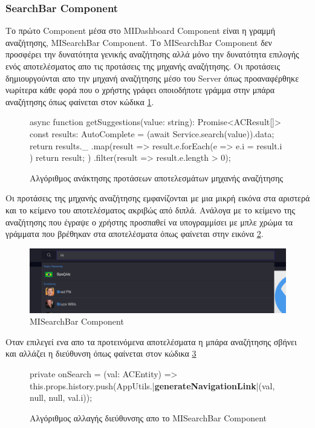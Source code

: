 \subsubsection{SearchBar Component}
Το πρώτο Component μέσα στο MIDashboard Component είναι η γραμμή αναζήτησης, MISearchBar Component. Το MISearchBar Component δεν προσφέρει την δυνατότητα γενικής αναζήτησης αλλά μόνο την δυνατότητα επιλογής ενός αποτελέσματος απο τις προτάσεις της μηχανής αναζήτησης. Οι προτάσεις δημιουργούνται απο την μηχανή αναζήτησης μέσο του Server όπως προαναφέρθηκε νωρίτερα κάθε φορά που ο χρήστης γράφει οποιοδήποτε γράμμα στην μπάρα αναζήτησης όπως φαίνεται στον κώδικα \ref{code:searchbar_suggestion}.

\begin{figure}[H]
    \begin{TypeScriptcode}
async function getSuggestions(value: string): Promise<ACResult[]> {
    const results: AutoComplete = (await Service.search(value)).data;
    return results._
      .map(result => {
        result.e.forEach(e => {
          e.i = result.i
        })
        return result;
      })
      .filter(result => result.e.length > 0);
}
    \end{TypeScriptcode}
    \caption{Αλγόριθμος ανάκτησης προτάσεων αποτελεσμάτων μηχανής αναζήτησης}
   \label{code:searchbar_suggestion}
\end{figure}

Οι προτάσεις της μηχανής αναζήτησης εμφανίζονται με μια μικρή εικόνα στα αριστερά και το κείμενο του αποτελέσματος ακριβώς από διπλά. Ανάλογα με το κείμενο της αναζήτησης που έγραψε ο χρήστης προσπαθεί να υπογραμμίσει με μπλε χρώμα τα γράμματα που βρέθηκαν στα αποτελέσματα όπως φαίνεται στην εικόνα \ref{layout:misearchbar}.
\begin{figure}[H]
  \centering
  \includegraphics[width=145mm]{Chapters/5 - Architecture/Client/Images/misearchbar_results.png}
  \caption{MISearchBar Component}
  \label{layout:misearchbar}
\end{figure}
Οταν επιλεγεί ενα απο τα προτεινόμενα αποτελέσματα η μπάρα αναζήτησης σβήνει και αλλάζει η διεύθυνση όπως φαίνεται στον κώδικα \ref{code:searchbar_urlchange}

\begin{figure}[H]
    \begin{TypeScriptcode}
private onSearch = (val: ACEntity) => {
  this.props.history.push(AppUtils.|\textbf{generateNavigationLink}|(val, null, null, val.i));
}
    \end{TypeScriptcode}
    \caption{Αλγόριθμος αλλαγής διεύθυνσης απο το MISearchBar Component}
   \label{code:searchbar_urlchange}
\end{figure}
